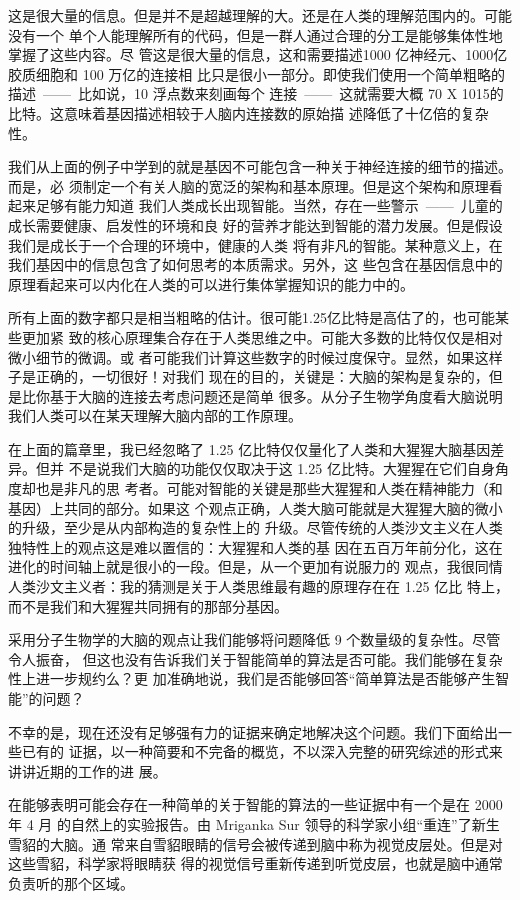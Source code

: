 这是很大量的信息。但是并不是超越理解的大。还是在人类的理解范围内的。可能没有一个
单个人能理解所有的代码，但是一群人通过合理的分工是能够集体性地掌握了这些内容。尽
管这是很大量的信息，这和需要描述1000 亿神经元、1000亿胶质细胞和 100 万亿的连接相
比只是很小一部分。即使我们使用一个简单粗略的描述~——~比如说，10 浮点数来刻画每个
连接~——~这就需要大概 70 X 1015的比特。这意味着基因描述相较于人脑内连接数的原始描
述降低了十亿倍的复杂性。

我们从上面的例子中学到的就是基因不可能包含一种关于神经连接的细节的描述。而是，必
须制定一个有关人脑的宽泛的架构和基本原理。但是这个架构和原理看起来足够有能力知道
我们人类成长出现智能。当然，存在一些警示~——~儿童的成长需要健康、启发性的环境和良
好的营养才能达到智能的潜力发展。但是假设我们是成长于一个合理的环境中，健康的人类
将有非凡的智能。某种意义上，在我们基因中的信息包含了如何思考的本质需求。另外，这
些包含在基因信息中的原理看起来可以内化在人类的可以进行集体掌握知识的能力中的。

所有上面的数字都只是相当粗略的估计。很可能1.25亿比特是高估了的，也可能某些更加紧
致的核心原理集合存在于人类思维之中。可能大多数的比特仅仅是相对微小细节的微调。或
者可能我们计算这些数字的时候过度保守。显然，如果这样子是正确的，一切很好！对我们
现在的目的，关键是：大脑的架构是复杂的，但是比你基于大脑的连接去考虑问题还是简单
很多。从分子生物学角度看大脑说明我们人类可以在某天理解大脑内部的工作原理。

在上面的篇章里，我已经忽略了 1.25 亿比特仅仅量化了人类和大猩猩大脑基因差异。但并
不是说我们大脑的功能仅仅取决于这 1.25 亿比特。大猩猩在它们自身角度却也是非凡的思
考者。可能对智能的关键是那些大猩猩和人类在精神能力（和基因）上共同的部分。如果这
个观点正确，人类大脑可能就是大猩猩大脑的微小的升级，至少是从内部构造的复杂性上的
升级。尽管传统的人类沙文主义在人类独特性上的观点这是难以置信的：大猩猩和人类的基
因在五百万年前分化，这在进化的时间轴上就是很小的一段。但是，从一个更加有说服力的
观点，我很同情人类沙文主义者：我的猜测是关于人类思维最有趣的原理存在在 1.25 亿比
特上，而不是我们和大猩猩共同拥有的那部分基因。

采用分子生物学的大脑的观点让我们能够将问题降低 9 个数量级的复杂性。尽管令人振奋，
但这也没有告诉我们关于智能简单的算法是否可能。我们能够在复杂性上进一步规约么？更
加准确地说，我们是否能够回答“简单算法是否能够产生智能”的问题？

不幸的是，现在还没有足够强有力的证据来确定地解决这个问题。我们下面给出一些已有的
证据，以一种简要和不完备的概览，不以深入完整的研究综述的形式来讲讲近期的工作的进
展。

在能够表明可能会存在一种简单的关于智能的算法的一些证据中有一个是在 2000 年 4 月
的自然上的实验报告。由 Mriganka Sur 领导的科学家小组“重连”了新生雪貂的大脑。通
常来自雪貂眼睛的信号会被传递到脑中称为视觉皮层处。但是对这些雪貂，科学家将眼睛获
得的视觉信号重新传递到听觉皮层，也就是脑中通常负责听的那个区域。

